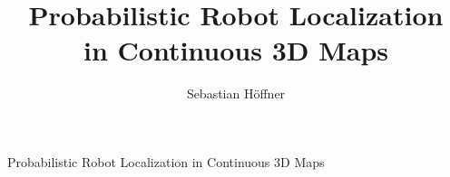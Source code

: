 \documentclass[english, bachelor, utf8]{base/thesis_KBS}
\begin{document}
\title{Probabilistic Robot Localization\\ in Continuous 3D Maps}
\author{Sebastian Höffner}


\generatetitle

\cleardoublepage
\begin{prefacesection}{Probabilistic Robot Localization in Continuous 3D Maps}

\end{prefacesection}

\cleardoublepage
\begin{acknowledgements}

\end{acknowledgements}

\cleardoublepage
\tableofcontents

\startTextChapters %













%

%



%



\appendix\addappheadtotoc

\cleardoublepage

\listoffigures
\listofalgorithms
\printglossary[title={List of Acronyms}]


\cleardoublepage



\cleardoublepage
\closing %

\newpage
\vspace*{1em}
\thispagestyle{empty}
\end{document}
